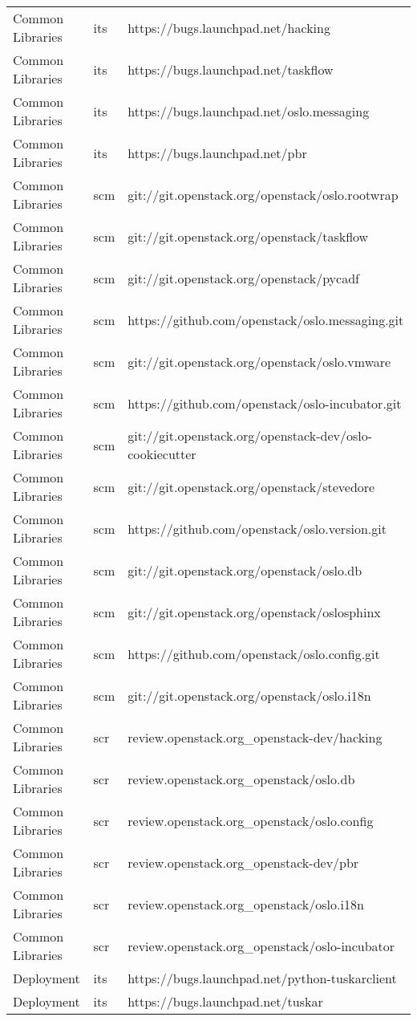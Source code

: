\begin{center}
\begin{longtable}{|p{4cm}|p{1cm}|p{10cm}|}
Common Libraries&its&https://bugs.launchpad.net/hacking\\ 
Common Libraries&its&https://bugs.launchpad.net/taskflow\\ 
Common Libraries&its&https://bugs.launchpad.net/oslo.messaging\\ 
Common Libraries&its&https://bugs.launchpad.net/pbr\\ 
Common Libraries&scm&git://git.openstack.org/openstack/oslo.rootwrap\\ 
Common Libraries&scm&git://git.openstack.org/openstack/taskflow\\ 
Common Libraries&scm&git://git.openstack.org/openstack/pycadf\\ 
Common Libraries&scm&https://github.com/openstack/oslo.messaging.git\\ 
Common Libraries&scm&git://git.openstack.org/openstack/oslo.vmware\\ 
Common Libraries&scm&https://github.com/openstack/oslo-incubator.git\\ 
Common Libraries&scm&git://git.openstack.org/openstack-dev/oslo-cookiecutter\\ 
Common Libraries&scm&git://git.openstack.org/openstack/stevedore\\ 
Common Libraries&scm&https://github.com/openstack/oslo.version.git\\ 
Common Libraries&scm&git://git.openstack.org/openstack/oslo.db\\ 
Common Libraries&scm&git://git.openstack.org/openstack/oslosphinx\\ 
Common Libraries&scm&https://github.com/openstack/oslo.config.git\\ 
Common Libraries&scm&git://git.openstack.org/openstack/oslo.i18n\\ 
Common Libraries&scr&review.openstack.org\_openstack-dev/hacking\\ 
Common Libraries&scr&review.openstack.org\_openstack/oslo.db\\ 
Common Libraries&scr&review.openstack.org\_openstack/oslo.config\\ 
Common Libraries&scr&review.openstack.org\_openstack-dev/pbr\\ 
Common Libraries&scr&review.openstack.org\_openstack/oslo.i18n\\ 
Common Libraries&scr&review.openstack.org\_openstack/oslo-incubator\\ 
Deployment&its&https://bugs.launchpad.net/python-tuskarclient\\ 
Deployment&its&https://bugs.launchpad.net/tuskar\\ 

\end{longtable}
\end{center}
